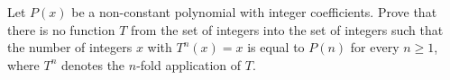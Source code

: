 Let $P(x)$ be a non-constant polynomial with integer coefficients. Prove that there is no function $T$ from the set of integers into the set of integers such that the number of integers $x$ with $T^n(x) = x$ is equal to $P(n)$ for every $n \geq 1$, where $T^n$ denotes the $n$-fold application of $T$.
